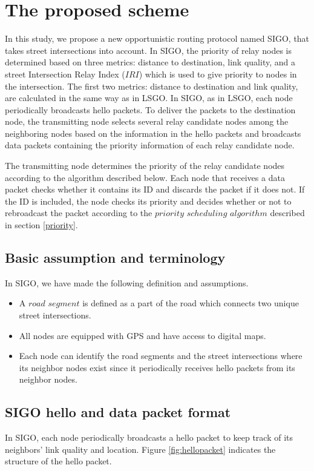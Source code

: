 \documentclass[conference]{IEEEtran}
\begin{document}
\section{The proposed scheme}
\label{SIGO}
In this study, we propose a new opportunistic routing protocol named SIGO, that takes street intersections into account. 
In SIGO, the priority of relay nodes is determined based on three metrics: distance to destination, link quality, and a street Intersection Relay Index ($IRI$) which is used to give priority to nodes in the intersection.
The first two metrics: distance to destination and link quality,  are calculated in the same way as in LSGO. 
In SIGO, as in LSGO, each node periodically broadcasts hello packets. To deliver the packets to the destination node, the transmitting node selects several relay candidate nodes among the neighboring nodes based on the information in the hello packets and broadcasts data packets containing the priority information of each relay candidate node.

The transmitting node determines the priority of the relay candidate nodes according to the algorithm described 
below. Each node that receives a data packet checks whether it contains its ID and discards the packet if it does not. If the ID is included, the node checks its priority and decides whether or not to rebroadcast the packet according to the $priority$ $scheduling$ $algorithm$ described in section \ref{priority}.

\subsection{Basic assumption and terminology}
In SIGO, we have made the following definition and assumptions.
\begin{itemize}
\item A $road$ $segment$ is defined as a part of the road which connects two unique street intersections.
\item All nodes are equipped with GPS and have access to digital maps.
\item Each node can identify the road segments and the street intersections where its neighbor nodes exist since it
periodically receives hello packets from its neighbor nodes.
\end{itemize}


\subsection{SIGO hello and data packet format}
In SIGO, each node periodically broadcasts a hello packet to keep track of its neighbors' link quality and location.  Figure \ref{fig:hellopacket} indicates the structure of the hello packet.
\end{document}
